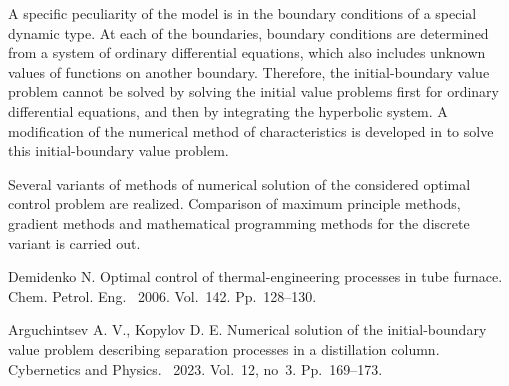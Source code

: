 \documentclass[12pt]{llncs}
\begin{document}
A specific peculiarity of the model is in the boundary conditions of a special dynamic type. At each of the boundaries, boundary conditions are determined from a system of ordinary differential equations, which also includes unknown values of functions on another boundary. Therefore, the initial-boundary value problem cannot be solved by solving the initial value problems first for ordinary differential equations, and then by integrating the hyperbolic system. A modification of the numerical method of characteristics is developed in \cite{Arg} to solve this initial-boundary value problem.

Several variants of methods of numerical solution of the considered optimal control problem are realized. Comparison of maximum principle methods, gradient methods and mathematical programming methods for the discrete variant is carried out.

\begin{thebibliography}{9} %
 Demidenko N. Optimal control of thermal-engineering processes in tube furnace. Chem. Petrol. Eng. ~2006. Vol.~142. Pp.~128--130.
    
 Arguchintsev A. V., Kopylov D. E. Numerical solution of the initial-boundary value problem describing separation processes in a distillation column. Cybernetics and Physics. ~2023. Vol.~12, no~3. Pp.~169--173.

\end{thebibliography}
\end{document}

